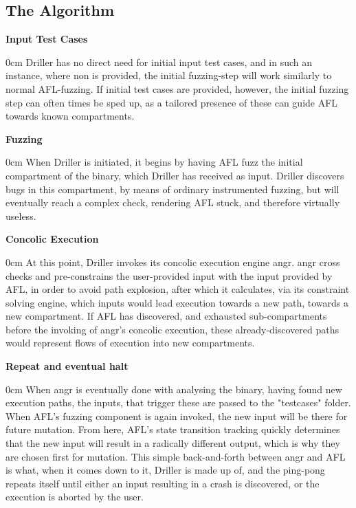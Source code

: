 \documentclass[a4paper]{article}
\newcommand{\tbf}[1]{\textbf{#1}}
\newcommand{\marginwidth}{0.5cm}
\newcommand{\subsubsubsection}[1]{\tbf{#1}\begin{addmargin}[\marginwidth]{0cm}}
\begin{document}
\subsection{The Algorithm}
\label{sec:TheAlgorithm}
\subsubsubsection{Input Test Cases}
Driller has no direct need for initial input test cases, and in such an instance, where non is provided, the initial fuzzing-step will work similarly to normal AFL-fuzzing. If initial test cases are provided, however, the initial fuzzing step can often times be sped up, as a tailored presence of these can guide AFL towards known compartments.
\end{addmargin}
\subsubsubsection{Fuzzing}
When Driller is initiated, it begins by having AFL fuzz the initial compartment of the binary, which Driller has received as input. Driller discovers bugs in this compartment, by means of ordinary instrumented fuzzing, but will eventually reach a complex check, rendering AFL stuck, and therefore virtually useless.
\end{addmargin}
\subsubsubsection{Concolic Execution}
At this point, Driller invokes its concolic execution engine angr. angr cross checks and pre-constrains the user-provided input with the input provided by AFL, in order to avoid path explosion, after which it calculates, via its constraint solving engine, which inputs would lead execution towards a new path, towards a new compartment. If AFL has discovered, and exhausted sub-compartments before the invoking of angr's concolic execution, these already-discovered paths would represent flows of execution into new compartments.
\end{addmargin}
\subsubsubsection{Repeat and eventual halt}
When angr is eventually done with analysing the binary, having found new execution paths, the inputs, that trigger these are passed to the "testcases" folder. When AFL's fuzzing component is again invoked, the new input will be there for future mutation. From here, AFL's state transition tracking quickly determines that the new input will result in a radically different output, which is why they are chosen first for mutation. This simple back-and-forth between angr and AFL is what, when it comes down to it, Driller is made up of, and the ping-pong repeats itself until either an input resulting in a crash is discovered, or the execution is aborted by the user. 
\end{addmargin}
\end{document}
